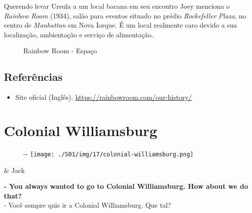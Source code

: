 Querendo levar Ursula a um local bacana em seu encontro Joey menciona o
\emph{Rainbow Room} (1934), salão para eventos situado no prédio
\emph{Rockefeller Plaza}, no centro de \emph{Manhattan} em Nova Iorque.
É um local realmente caro devido a sua localização, ambientação e
serviço de alimentação.

\begin{figure}
  \centering
    \caption{Rainbow Room - Espaço\label{fig:rainbow-room-espa-o}}
\end{figure}

\hypertarget{referuxeancias}{%
\subsection{Referências}\label{referuxeancias}}

\begin{itemize}
\tightlist
\item
  \sloppy Site oficial (Inglês). \url{https://rainbowroom.com/our-history/}
\end{itemize}

\hypertarget{colonial-williamsburg}{%
\section{Colonial Williamsburg}\label{colonial-williamsburg}}

\begin{figure}[!ht]
  \begin{adjustwidth}{-\oddsidemargin-1in}{-\rightmargin}
    \centering
    \texttt{[image: ./S01/img/17/colonial-williamsburg.png]}
  \end{adjustwidth}
\end{figure}

\begin{tcolorbox}[enhanced,center upper,
    drop fuzzy shadow southeast, boxrule=0.3pt,
    lower separated=false, breakable,
    colframe=black!30!dialogoBorder,colback=white]
\begin{minipage}[c]{0.16\linewidth}
   & \centering \scriptsize{Jack}
\end{minipage}
\hfill
\begin{minipage}[c]{0.8\linewidth}
  \textbf{- You always wanted to go to Colonial Williamsburg. How about we do that?}\\
  - Você sempre quis ir a Colonial Williamsburg. Que tal?
\end{minipage}
\end{tcolorbox}

